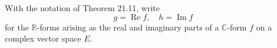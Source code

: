 With the notation of Theorem 21.11, write
$$g = \operatorname{Re} f, \quad h = \operatorname{Im} f$$
for the $\mathbb{R}$-forms arising as the real and imaginary parts of a $\mathbb{C}$-form $f$ on a complex vector space $E$.
